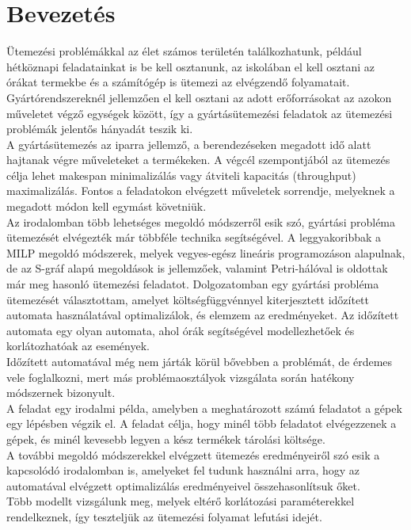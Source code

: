 \documentclass {report}
\begin{document}


\tableofcontents
\chapter{Bevezetés}
Ütemezési problémákkal az élet számos területén találkozhatunk, például hétköznapi feladatainkat is be kell osztanunk, az iskolában el kell osztani az órákat termekbe és a számítógép is ütemezi az elvégzendő folyamatait. Gyártórendszereknél jellemzően el kell osztani az adott erőforrásokat az azokon műveletet végző egységek között, így a gyártásütemezési feladatok az ütemezési problémák jelentős hányadát teszik ki. \\
A gyártásütemezés az iparra jellemző, a berendezéseken megadott idő alatt hajtanak végre műveleteket a termékeken. A végcél szempontjából az ütemezés célja lehet makespan minimalizálás vagy átviteli kapacitás (throughput) maximalizálás. Fontos a feladatokon elvégzett műveletek sorrendje, melyeknek a megadott módon kell egymást követniük.\\
Az irodalomban több lehetséges megoldó módszerről esik szó, gyártási probléma ütemezését elvégezték már többféle technika segítségével. A leggyakoribbak a MILP megoldó módszerek, melyek vegyes-egész lineáris programozáson alapulnak, de az S-gráf alapú megoldások is jellemzőek, valamint Petri-hálóval is oldottak már meg hasonló ütemezési feladatot.
Dolgozatomban egy gyártási probléma ütemezését választottam, amelyet költségfüggvénnyel kiterjesztett időzített automata használatával optimalizálok, és elemzem az eredményeket. Az időzített automata egy olyan automata, ahol órák segítségével modellezhetőek és korlátozhatóak az események.\\
Időzített automatával még nem járták körül bővebben a problémát, de érdemes vele foglalkozni, mert más problémaosztályok vizsgálata során hatékony módszernek bizonyult.\\
A feladat egy irodalmi példa, amelyben a meghatározott számú feladatot a gépek egy lépésben végzik el.
A feladat célja, hogy minél több feladatot elvégezzenek a gépek, és minél kevesebb legyen a kész termékek tárolási költsége.\\
A további megoldó módszerekkel elvégzett ütemezés eredményeiről szó esik a kapcsolódó irodalomban is, amelyeket fel tudunk használni arra, hogy az automatával elvégzett optimalizálás eredményeivel összehasonlítsuk őket. \\
Több modellt vizsgálunk meg, melyek eltérő korlátozási paraméterekkel rendelkeznek, így teszteljük az ütemezési folyamat lefutási idejét.
\end{document}
